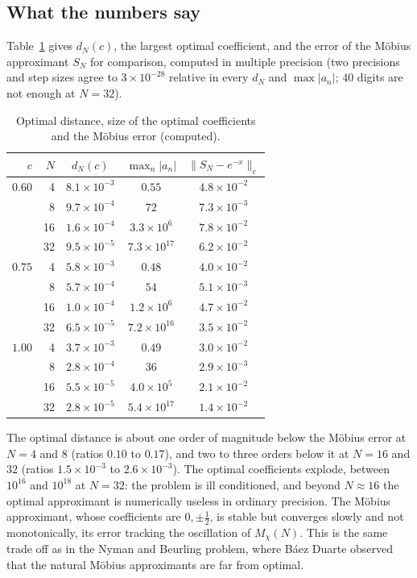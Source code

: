\subsection{What the numbers say}

Table~\ref{lv:tab:dN} gives $d_N(c)$, the largest optimal coefficient, and the error of the M\"obius approximant $S_N$ for comparison, computed in multiple precision (two precisions and step sizes agree to $3\times10^{-28}$ relative in every $d_N$ and $\max|a_n|$; $40$ digits are not enough at $N=32$).

\begin{table}[h]\centering\footnotesize
\begin{tabular}{rrccc}
\toprule
$c$ & $N$ & $d_N(c)$ & $\max_n|a_n|$ & $\|S_N-e^{-x}\|_c$\\
\midrule
$0.60$ & 4 & $8.1\times10^{-3}$ & $0.55$ & $4.8\times10^{-2}$\\
 & 8 & $9.7\times10^{-4}$ & $72$ & $7.3\times10^{-3}$\\
 & 16 & $1.6\times10^{-4}$ & $3.3\times10^{6}$ & $7.8\times10^{-2}$\\
 & 32 & $9.5\times10^{-5}$ & $7.3\times10^{17}$ & $6.2\times10^{-2}$\\
\midrule
$0.75$ & 4 & $5.8\times10^{-3}$ & $0.48$ & $4.0\times10^{-2}$\\
 & 8 & $5.7\times10^{-4}$ & $54$ & $5.1\times10^{-3}$\\
 & 16 & $1.0\times10^{-4}$ & $1.2\times10^{6}$ & $4.7\times10^{-2}$\\
 & 32 & $6.5\times10^{-5}$ & $7.2\times10^{16}$ & $3.5\times10^{-2}$\\
\midrule
$1.00$ & 4 & $3.7\times10^{-3}$ & $0.49$ & $3.0\times10^{-2}$\\
 & 8 & $2.8\times10^{-4}$ & $36$ & $2.9\times10^{-3}$\\
 & 16 & $5.5\times10^{-5}$ & $4.0\times10^{5}$ & $2.1\times10^{-2}$\\
 & 32 & $2.8\times10^{-5}$ & $5.4\times10^{17}$ & $1.4\times10^{-2}$\\
\bottomrule
\end{tabular}
\caption{Optimal distance, size of the optimal coefficients and the M\"obius error (computed).}\label{lv:tab:dN}
\end{table}

The optimal distance is about one order of magnitude below the M\"obius error at $N=4$ and $8$ (ratios $0.10$ to $0.17$), and two to three orders below it at $N=16$ and $32$ (ratios $1.5\times10^{-3}$ to $2.6\times10^{-3}$). The optimal coefficients explode, between $10^{16}$ and $10^{18}$ at $N=32$: the problem is ill conditioned, and beyond $N\approx16$ the optimal approximant is numerically useless in ordinary precision. The M\"obius approximant, whose coefficients are $0,\pm\frac12$, is stable but converges slowly and not monotonically, its error tracking the oscillation of $M_\chi(N)$. This is the same trade off as in the Nyman and Beurling problem, where B\'aez Duarte \cite{BaezDuarte03} observed that the natural M\"obius approximants are far from optimal.

